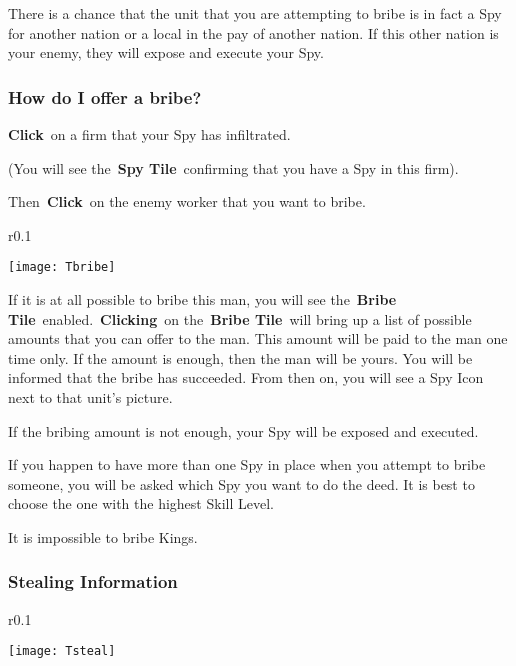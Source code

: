 There is a chance that the unit that you are attempting to bribe is in fact a Spy for another nation or a local in the pay of another nation. If this other nation is your enemy, they will expose and execute your Spy.

\subsubsection{How do I offer a bribe?}

\textbf{Click} on a firm that your Spy has infiltrated.

(You will see the \textbf{Spy Tile} confirming that you have a Spy in this firm).

Then \textbf{Click} on the enemy worker that you want to bribe.

\begin{wrapfigure}{r}{0.1\textwidth}
	\vspace{-20pt}
	\begin{center}
		\texttt{[image: Tbribe]}
	\end{center}
	\vspace{-20pt}
\end{wrapfigure}

If it is at all possible to bribe this man, you will see the \textbf{Bribe Tile} enabled. \textbf{Clicking} on the \textbf{Bribe Tile} will bring up a list of possible amounts that you can offer to the man. This amount will be paid to the man one time only. If the amount is enough, then the man will be yours. You will be informed that the bribe has succeeded. From then on, you will see a Spy Icon next to that unit’s picture.

If the bribing amount is not enough, your Spy will be exposed and executed.

If you happen to have more than one Spy in place when you attempt to bribe someone, you will be asked which Spy you want to do the deed. It is best to choose the one with the highest Skill Level.

It is impossible to bribe Kings.

\subsubsection{Stealing Information}

\begin{wrapfigure}{r}{0.1\textwidth}
	\vspace{-20pt}
	\begin{center}
		\texttt{[image: Tsteal]}
	\end{center}
	\vspace{-20pt}
\end{wrapfigure}

